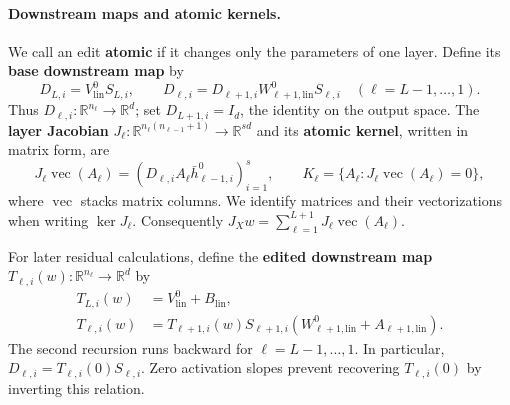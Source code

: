 \documentclass[twoside]{article}
\theoremstyle{remark}
\newcommand{\R}{\mathbb R}
\theoremstyle{highlightdefinition}
\theoremstyle{remark}
\begin{document}
\paragraph{Downstream maps and atomic kernels.}
We call an edit \textbf{atomic} if it changes only the parameters of one layer. Define its \textbf{base downstream map} by
\[
 D_{L,i}=V_{\mathrm{lin}}^0S_{L,i},\qquad
 D_{\ell,i}=D_{\ell+1,i}W_{\ell+1,\mathrm{lin}}^0S_{\ell,i}
 \quad(\ell=L-1,\ldots,1).
\]
Thus $D_{\ell,i}:\R^{n_\ell}\to\R^d$; set $D_{L+1,i}=I_d$, the identity on the output space. The \textbf{layer Jacobian} $J_\ell:\R^{n_\ell(n_{\ell-1}+1)}\to\R^{sd}$ and its \textbf{atomic kernel}, written in matrix form, are
\[
 J_\ell\operatorname{vec}(A_\ell)
   =(D_{\ell,i}A_\ell\bar h_{\ell-1,i}^0)_{i=1}^s,
 \qquad K_\ell=\{A_\ell:J_\ell\operatorname{vec}(A_\ell)=0\},
\]
where $\operatorname{vec}$ stacks matrix columns. We identify matrices and their vectorizations when writing $\ker J_\ell$. Consequently $J_Xw=\sum_{\ell=1}^{L+1}J_\ell\operatorname{vec}(A_\ell)$.

For later residual calculations, define the \textbf{edited downstream map} $T_{\ell,i}(w):\R^{n_\ell}\to\R^d$ by
\begin{align*}
 T_{L,i}(w)&=V_{\mathrm{lin}}^0+B_{\mathrm{lin}},\\
 T_{\ell,i}(w)&=T_{\ell+1,i}(w)S_{\ell+1,i}
             (W_{\ell+1,\mathrm{lin}}^0+A_{\ell+1,\mathrm{lin}}).
\end{align*}
The second recursion runs backward for $\ell=L-1,\ldots,1$. In particular, $D_{\ell,i}=T_{\ell,i}(0)S_{\ell,i}$. Zero activation slopes prevent recovering $T_{\ell,i}(0)$ by inverting this relation.
\end{document}
